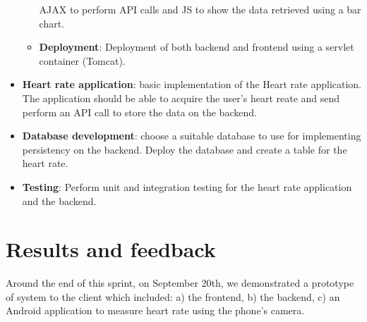 \begin{itemize}
\begin{itemize}
			AJAX to perform API calls and JS to show the data retrieved using a bar chart.
		\item \textbf{Deployment}:
			Deployment of both backend and frontend using a servlet container (Tomcat).
	\end{itemize}
	\item \textbf{Heart rate application}:
		basic implementation of the Heart rate application. The application should be able to acquire
		the user's heart reate and send perform an API call to store the data on the backend.
	\item \textbf{Database development}:
		choose a suitable database to use for implementing persistency on the backend.
		Deploy the database and create a table for the heart rate.
	\item \textbf{Testing}:
		Perform unit and integration testing for the heart rate application and the backend.
\end{itemize}

\section{Results and feedback}

Around the end of this sprint, on September 20th, we demonstrated a prototype of system to
the client which included: a) the frontend, b) the backend, c) an Android application to measure
heart rate using the phone's camera.

